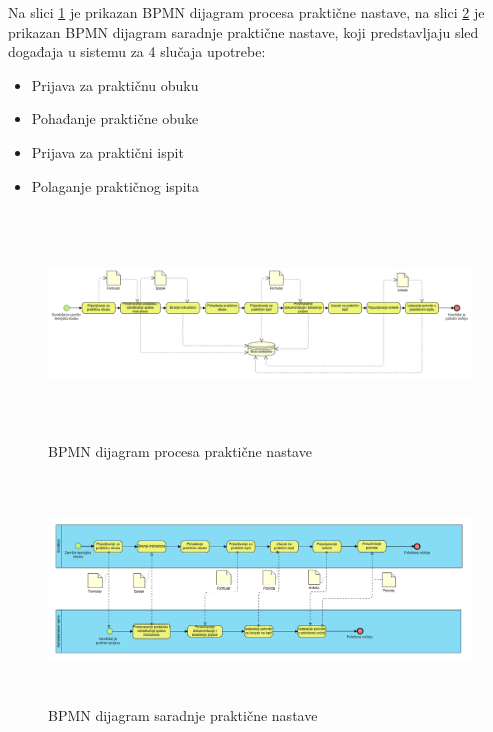 Na slici \ref{fig:bpmnP_podnosenje_zahteva} je prikazan BPMN dijagram procesa praktične nastave, 
na slici \ref{fig:bpmnS_podnosenje_zahteva} je prikazan BPMN dijagram saradnje praktične nastave, 
koji predstavljaju sled događaja u sistemu za 4 slučaja upotrebe:
\begin{itemize}
    \item Prijava za praktičnu obuku
    \item Pohađanje praktične obuke
    \item Prijava za praktični ispit
    \item Polaganje praktičnog ispita
\end{itemize}

\begin{figure}[H]
    \begin{center}
        \includegraphics[width=120mm, height=60mm]{Diagrams/bpmnP_prakticna_nastava.png}
    \end{center}
    \caption {BPMN dijagram procesa praktične nastave}
    \label{fig:bpmnP_podnosenje_zahteva}

\end{figure}

\begin{figure}[H]
    \begin{center}
        \includegraphics[width=120mm, height=60mm]{Diagrams/bpmnS_prakticna_nastava.png}
    \end{center}
    \caption {BPMN dijagram saradnje praktične nastave}
    \label{fig:bpmnS_podnosenje_zahteva}

\end{figure}

